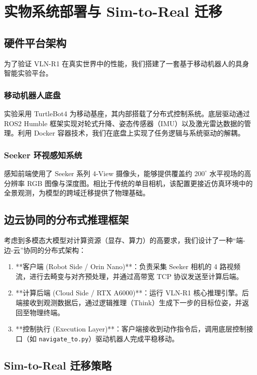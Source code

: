 \cleardoublepage

\section{实物系统部署与 Sim-to-Real 迁移}

\subsection{硬件平台架构}
为了验证 VLN-R1 在真实世界中的性能，我们搭建了一套基于移动机器人的具身智能实验平台。

\subsubsection{移动机器人底盘}
实验采用 TurtleBot4 为移动基座，其内部搭载了分布式控制系统。底层驱动通过 ROS2 Humble 框架实现对轮式升降、姿态传感器（IMU）以及激光雷达数据的管理。利用 Docker 容器技术，我们在底盘上实现了任务逻辑与系统驱动的解耦。

\subsubsection{Seeker 环视感知系统}
感知前端使用了 Seeker 系列 4-View 摄像头，能够提供覆盖约 $200^{\circ}$ 水平视场的高分辨率 RGB 图像与深度图。相比于传统的单目相机，该配置更接近仿真环境中的全景观测，为模型的跨域迁移提供了物理基础。

\subsection{边云协同的分布式推理框架}
考虑到多模态大模型对计算资源（显存、算力）的高要求，我们设计了一种“端-边-云”协同的分布式架构：
\begin{enumerate}
    \item **客户端 (Robot Side / Orin Nano)**：负责采集 Seeker 相机的 4 路视频流，进行去畸变与对齐预处理，并通过高带宽 TCP 协议发送至计算后端。
    \item **计算后端 (Cloud Side / RTX A6000)**：运行 VLN-R1 核心推理引擎。后端接收到观测数据后，通过逻辑推理（Think）生成下一步的目标位姿，并返回至物理终端。
    \item **控制执行 (Execution Layer)**：客户端接收到动作指令后，调用底层控制接口（如 \texttt{navigate\_to.py}）驱动机器人完成平稳移动。
\end{enumerate}

\subsection{Sim-to-Real 迁移策略}

